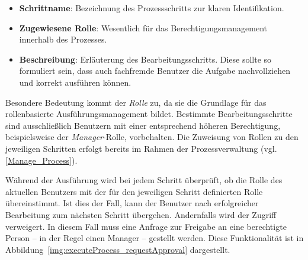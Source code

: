 \begin{itemize}
    \item \textbf{Schrittname}: Bezeichnung des Prozessschritts zur klaren Identifikation.
    \item \textbf{Zugewiesene Rolle}: Wesentlich für das Berechtigungsmanagement innerhalb des Prozesses.
    \item \textbf{Beschreibung}: Erläuterung des Bearbeitungsschritts. Diese sollte so formuliert sein, dass auch fachfremde Benutzer die Aufgabe nachvollziehen und korrekt ausführen können.
\end{itemize}

Besondere Bedeutung kommt der \textit{Rolle} zu, da sie die Grundlage für das rollenbasierte Ausführungsmanagement bildet. Bestimmte Bearbeitungsschritte sind ausschließlich Benutzern mit einer entsprechend höheren Berechtigung, beispielsweise der \textit{Manager}-Rolle, vorbehalten. Die Zuweisung von Rollen zu den jeweiligen Schritten erfolgt bereits im Rahmen der Prozessverwaltung (vgl. \autoref{Manage_Process}).

Während der Ausführung wird bei jedem Schritt überprüft, ob die Rolle des aktuellen Benutzers mit der für den jeweiligen Schritt definierten Rolle übereinstimmt. Ist dies der Fall, kann der Benutzer nach erfolgreicher Bearbeitung zum nächsten Schritt übergehen. Andernfalls wird der Zugriff verweigert. In diesem Fall muss eine Anfrage zur Freigabe an eine berechtigte Person – in der Regel einen Manager – gestellt werden. Diese Funktionalität ist in Abbildung~\ref{img:executeProcess_requestApproval} dargestellt.


